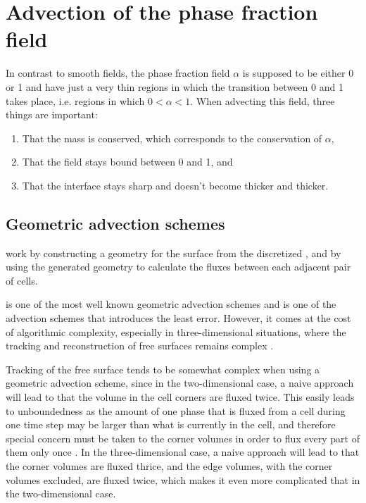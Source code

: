 \section{Advection of the phase fraction field}

\label{sec:advection_of_phase_fraction}

In contrast to smooth fields, the phase fraction field $\alpha$ is supposed to be either 0 or 1 and have just a very thin regions in which the transition between 0 and 1 takes place, i.e. regions in which $0 < \alpha < 1$. When advecting this field, three things are important:

\begin{enumerate}
\item That the mass is conserved, which corresponds to the conservation of $\alpha$,
\item That the field stays bound between 0 and 1, and
\item That the interface stays sharp and doesn't become thicker and thicker.
\end{enumerate}

\subsection{Geometric advection schemes}

 work by constructing a geometry for the surface from the discretized , and by using the generated geometry to calculate the fluxes between each adjacent pair of cells.

\PLIC is one of the most well known geometric advection schemes and is one of the advection schemes that introduces the least error. However, it comes at the cost of algorithmic complexity, especially in three-dimensional situations, where the tracking and reconstruction of free surfaces remains complex \citep{Ingram2009}.

Tracking of the free surface tends to be somewhat complex when using a geometric advection scheme, since in the two-dimensional case, a naive approach will lead to that the volume in the cell corners are fluxed twice. This easily leads to unboundedness as the amount of one phase that is fluxed from a cell during one time step may be larger than what is currently in the cell, and therefore special concern must be taken to the corner volumes in order to flux every part of them only once \citep{Rider1997}. In the three-dimensional case, a naive approach will lead to that the corner volumes are fluxed thrice, and the edge volumes, with the corner volumes excluded, are fluxed twice, which makes it even more complicated that in the two-dimensional case.


